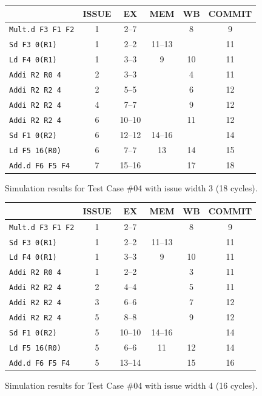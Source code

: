 \documentclass[11pt]{article}
\renewcommand{\_}{\origunderscore\allowbreak}
\begin{document}
\begin{figure}[H]
\centering
\small
\begin{tabular}{lccccc}
\hline
 & ISSUE & EX & MEM & WB & COMMIT \\
\hline
\texttt{Mult.d F3 F1 F2} & 1 & 2--7 &  & 8 & 9 \\
\texttt{Sd F3 0(R1)} & 1 & 2--2 & 11--13 &  & 11 \\
\texttt{Ld F4 0(R1)} & 1 & 3--3 & 9 & 10 & 11 \\
\texttt{Addi R2 R0 4} & 2 & 3--3 &  & 4 & 11 \\
\texttt{Addi R2 R2 4} & 2 & 5--5 &  & 6 & 12 \\
\texttt{Addi R2 R2 4} & 4 & 7--7 &  & 9 & 12 \\
\texttt{Addi R2 R2 4} & 6 & 10--10 &  & 11 & 12 \\
\texttt{Sd F1 0(R2)} & 6 & 12--12 & 14--16 &  & 14 \\
\texttt{Ld F5 16(R0)} & 6 & 7--7 & 13 & 14 & 15 \\
\texttt{Add.d F6 F5 F4} & 7 & 15--16 &  & 17 & 18 \\
\hline
\end{tabular}
\caption{Simulation results for Test Case \#04 with issue width 3 (18 cycles).}
\end{figure}

\begin{figure}[H]
\centering
\small
\begin{tabular}{lccccc}
\hline
 & ISSUE & EX & MEM & WB & COMMIT \\
\hline
\texttt{Mult.d F3 F1 F2} & 1 & 2--7 &  & 8 & 9 \\
\texttt{Sd F3 0(R1)} & 1 & 2--2 & 11--13 &  & 11 \\
\texttt{Ld F4 0(R1)} & 1 & 3--3 & 9 & 10 & 11 \\
\texttt{Addi R2 R0 4} & 1 & 2--2 &  & 3 & 11 \\
\texttt{Addi R2 R2 4} & 2 & 4--4 &  & 5 & 11 \\
\texttt{Addi R2 R2 4} & 3 & 6--6 &  & 7 & 12 \\
\texttt{Addi R2 R2 4} & 5 & 8--8 &  & 9 & 12 \\
\texttt{Sd F1 0(R2)} & 5 & 10--10 & 14--16 &  & 14 \\
\texttt{Ld F5 16(R0)} & 5 & 6--6 & 11 & 12 & 14 \\
\texttt{Add.d F6 F5 F4} & 5 & 13--14 &  & 15 & 16 \\
\hline
\end{tabular}
\caption{Simulation results for Test Case \#04 with issue width 4 (16 cycles).}
\end{figure}
\end{document}
